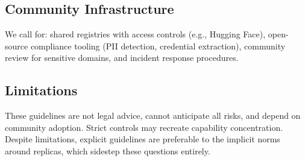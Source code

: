 \documentclass[letterpaper]{article}
\begin{document}
\subsection{Community Infrastructure}

We call for: shared registries with access controls (e.g., Hugging Face), open-source compliance tooling (PII detection, credential extraction), community review for sensitive domains, and incident response procedures.

\subsection{Limitations}

These guidelines are not legal advice, cannot anticipate all risks, and depend on community adoption. Strict controls may recreate capability concentration. Despite limitations, explicit guidelines are preferable to the implicit norms around replicas, which sidestep these questions entirely.
\end{document}
